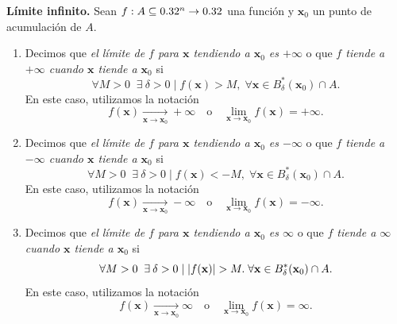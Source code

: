\begin{definition}\textbf{L\'imite infinito.} \label{def:lim_inf}
  Sean $f : A  \subseteq  0.32^n \to 0.32$ una funci\'on y $\mathbf{x}_0$ un punto de acumulaci\'on de $A$. 
  \begin{enumerate} %
   \item Decimos que \emph{el l\'imite de $f$ para $\mathbf{x}$ tendiendo a $\mathbf{x}_0$ es $+\infty$} o que \emph{$f$ tiende a $+\infty$ cuando $\mathbf{x}$ tiende a $\mathbf{x}_0$} si
    \[
      \forall M > 0\;\;\exists\: \delta > 0\;|\;f(\mathbf{x}) > M, \; \forall 
	  \mathbf{x} \in B_{\delta}^*(\mathbf{x}_0) \cap A.
    \]
    En este caso, utilizamos la notaci\'on
    \[
      f(\mathbf{x}) \xrightarrow[\mathbf{x} \to \mathbf{x}_0]{} +\infty \quad \text{o} \quad \lim_{\mathbf{x} \to \mathbf{x}_0} f(\mathbf{x}) = +\infty.
    \]
   \item Decimos que \emph{el l\'imite de $f$ para $\mathbf{x}$ tendiendo a $\mathbf{x}_0$ es $-\infty$} o que \emph{$f$ tiende a $-\infty$ cuando $\mathbf{x}$ tiende a $\mathbf{x}_0$} si
    \[
      \forall M > 0\;\;\exists\: \delta > 0 \;|\; f(\mathbf{x}) < -M, \; \forall 
	  \mathbf{x} \in B_{\delta}^*(\mathbf{x}_0) \cap A.
    \]
    En este caso, utilizamos la notaci\'on
    \[
      f(\mathbf{x}) \xrightarrow[\mathbf{x} \to \mathbf{x}_0]{} -\infty \quad \text{o} \quad \lim_{\mathbf{x} \to \mathbf{x}_0} f(\mathbf{x}) = -\infty.
    \]
   \item Decimos que \emph{el l\'imite de $f$ para $\mathbf{x}$ tendiendo a $\mathbf{x}_0$ es $\infty$} o que \emph{$f$ tiende a $\infty$ cuando $\mathbf{x}$ tiende a $\mathbf{x}_0$} si
    \[
      \forall M > 0 \;\; \exists\: \delta > 0 \;|\; \abs{f(\mathbf{x})} > M.\; \forall \mathbf{x} \in B_{\delta}^*(\mathbf{x}_0) \cap A.
    \]
    En este caso, utilizamos la notaci\'on
    \[
      f(\mathbf{x}) \xrightarrow[\mathbf{x} \to \mathbf{x}_0]{} \infty \quad \text{o} \quad \lim_{\mathbf{x} \to \mathbf{x}_0} f(\mathbf{x}) = \infty.
    \]
  \end{enumerate}
\end{definition}

